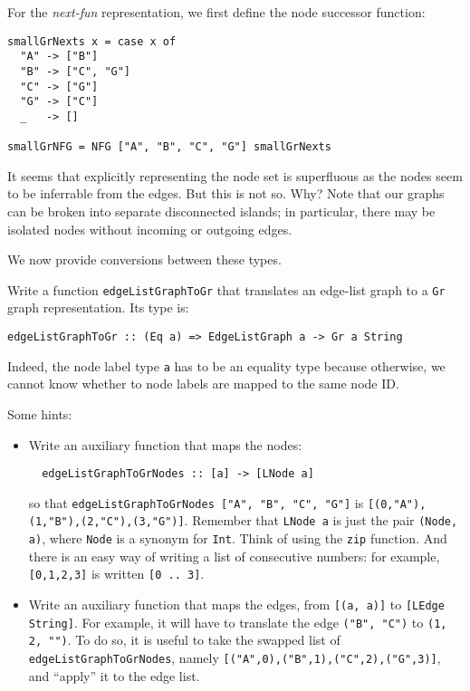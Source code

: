 \documentclass[english]{article}
\begin{document}
For the \emph{next-fun} representation, we first define the node successor
function:
\begin{lstlisting}
smallGrNexts x = case x of
  "A" -> ["B"]
  "B" -> ["C", "G"]
  "C" -> ["G"]
  "G" -> ["C"]
  _   -> []

smallGrNFG = NFG ["A", "B", "C", "G"] smallGrNexts
\end{lstlisting}


It seems that explicitly representing the node set is superfluous as the
nodes seem to be inferrable from the edges. But this is not so. Why? Note that
our graphs can be broken into separate disconnected islands; in particular,
there may be isolated nodes without incoming or outgoing edges.

We now provide conversions between these types.


\begin{exo}\label{exo:edgeListGraphToGr}
Write a function \texttt{edgeListGraphToGr} that translates an edge-list graph
to a \texttt{Gr} graph representation. Its type is:

\begin{lstlisting}
edgeListGraphToGr :: (Eq a) => EdgeListGraph a -> Gr a String
\end{lstlisting}
Indeed, the node label type \texttt{a} has to be an equality type because
otherwise, we cannot know whether to node labels are mapped to the same node
ID.

Some hints:
\begin{itemize}
\item Write an auxiliary function that maps the nodes:
\begin{lstlisting}
  edgeListGraphToGrNodes :: [a] -> [LNode a]
\end{lstlisting}
so that \texttt{edgeListGraphToGrNodes ["A", "B", "C", "G"]} is
\texttt{[(0,"A"),(1,"B"),(2,"C"),(3,"G")]}.
Remember that \texttt{LNode a} is just the pair  \texttt{(Node, a)}, where
\texttt{Node} is a synonym for \texttt{Int}. 
Think of using the \texttt{zip} function. And there is an easy way of writing
a list of consecutive numbers: for example, \texttt{[0,1,2,3]} is written
\texttt{[0 .. 3]}.

\item Write an auxiliary function that maps the edges, from \texttt{[(a, a)]}
  to \texttt{[LEdge String]}. 
  For example, it will have to translate the edge \texttt{("B", "C")} to
  \texttt{(1, 2, "")}. To do so, it is useful to take the swapped list of
  \texttt{edgeListGraphToGrNodes}, namely
  \texttt{[("A",0),("B",1),("C",2),("G",3)]}, and ``apply'' it to the edge list.
\end{itemize}
\end{exo}
\end{document}
